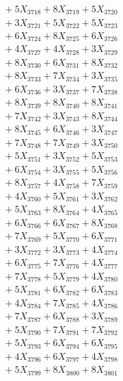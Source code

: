 \documentclass[a4paper,10pt]{article}
\begin{document}
{\begin{align}
&\;  + 5 X_{3718} + 8 X_{3719} + 5 X_{3720} \\[0.3ex]
&\;  + 3 X_{3721} + 5 X_{3722} + 5 X_{3723} \\[0.3ex]
&\;  + 6 X_{3724} + 8 X_{3725} + 6 X_{3726} \\[0.3ex]
&\;  + 4 X_{3727} + 4 X_{3728} + 3 X_{3729} \\[0.5ex]\allowbreak
&\;  + 8 X_{3730} + 6 X_{3731} + 8 X_{3732} \\[0.3ex]
&\;  + 8 X_{3733} + 7 X_{3734} + 3 X_{3735} \\[0.3ex]
&\;  + 6 X_{3736} + 3 X_{3737} + 7 X_{3738} \\[0.3ex]
&\;  + 8 X_{3739} + 8 X_{3740} + 8 X_{3741} \\[0.3ex]
&\;  + 7 X_{3742} + 3 X_{3743} + 8 X_{3744} \\[0.3ex]
&\;  + 8 X_{3745} + 6 X_{3746} + 3 X_{3747} \\[0.3ex]
&\;  + 7 X_{3748} + 7 X_{3749} + 3 X_{3750} \\[0.3ex]
&\;  + 5 X_{3751} + 3 X_{3752} + 5 X_{3753} \\[0.3ex]
&\;  + 6 X_{3754} + 3 X_{3755} + 5 X_{3756} \\[0.3ex]
&\;  + 8 X_{3757} + 4 X_{3758} + 7 X_{3759} \\[0.5ex]\allowbreak
&\;  + 4 X_{3760} + 5 X_{3761} + 3 X_{3762} \\[0.3ex]
&\;  + 5 X_{3763} + 8 X_{3764} + 4 X_{3765} \\[0.3ex]
&\;  + 6 X_{3766} + 6 X_{3767} + 8 X_{3768} \\[0.3ex]
&\;  + 7 X_{3769} + 5 X_{3770} + 6 X_{3771} \\[0.3ex]
&\;  + 3 X_{3772} + 3 X_{3773} + 4 X_{3774} \\[0.3ex]
&\;  + 6 X_{3775} + 7 X_{3776} + 4 X_{3777} \\[0.3ex]
&\;  + 7 X_{3778} + 5 X_{3779} + 4 X_{3780} \\[0.3ex]
&\;  + 5 X_{3781} + 6 X_{3782} + 6 X_{3783} \\[0.3ex]
&\;  + 4 X_{3784} + 7 X_{3785} + 4 X_{3786} \\[0.3ex]
&\;  + 7 X_{3787} + 6 X_{3788} + 3 X_{3789} \\[0.5ex]\allowbreak
&\;  + 5 X_{3790} + 7 X_{3791} + 7 X_{3792} \\[0.3ex]
&\;  + 5 X_{3793} + 6 X_{3794} + 6 X_{3795} \\[0.3ex]
&\;  + 4 X_{3796} + 6 X_{3797} + 4 X_{3798} \\[0.3ex]
&\;  + 5 X_{3799} + 8 X_{3800} + 8 X_{3801} \\[0.3ex]

\end{align}}
\end{document}
